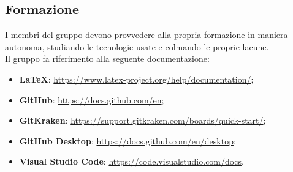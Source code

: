 \subsection{Formazione}
I membri del gruppo devono provvedere alla propria formazione in maniera autonoma, studiando le tecnologie usate e colmando le proprie lacune.\\
Il gruppo fa riferimento alla seguente documentazione:
\begin {itemize}
\item \textbf{\LaTeX}: \url{https://www.latex-project.org/help/documentation/};
\item \textbf{GitHub}: \url{https://docs.github.com/en};
\item \textbf{GitKraken}: \url{https://support.gitkraken.com/boards/quick-start/};
\item \textbf{GitHub Desktop}: \url{https://docs.github.com/en/desktop};
\item \textbf{Visual Studio Code}: \url{https://code.visualstudio.com/docs}.
\end {itemize}